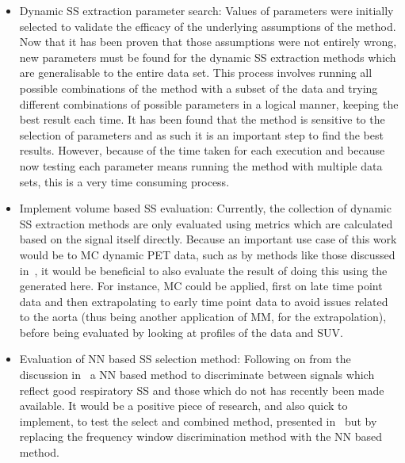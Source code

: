             \begin{itemize}
                \item Dynamic \gls{SS} extraction parameter search: Values of parameters were initially selected to validate the efficacy of the underlying assumptions of the method. Now that it has been proven that those assumptions were not entirely wrong, new parameters must be found for the dynamic \gls{SS} extraction methods which are generalisable to the entire data set. This process involves running all possible combinations of the method with a subset of the data and trying different combinations of possible parameters in a logical manner, keeping the best result each time. It has been found that the method is sensitive to the selection of parameters and as such it is an important step to find the best results. However, because of the time taken for each execution and because now testing each parameter means running the method with multiple data sets, this is a very time consuming process.
    
                \item Implement volume based \gls{SS} evaluation: Currently, the collection of dynamic \gls{SS} extraction methods are only evaluated using metrics which are calculated based on the signal itself directly. Because an important use case of this work would be to \gls{MC} dynamic \gls{PET} data, such as by methods like those discussed in~, it would be beneficial to also evaluate the result of doing this using the  generated here. For instance, \gls{MC} could be applied, first on late time point data and then extrapolating to early time point data to avoid issues related to the aorta (thus being another application of \gls{MM}, for the extrapolation), before being evaluated by looking at profiles of the data and \gls{SUV}.
    
                \item Evaluation of \gls{NN} based \gls{SS} selection method: Following on from the discussion in~ a \gls{NN} based method to discriminate between signals which reflect good respiratory \gls{SS} and those which do not has recently been made available. It would be a positive piece of research, and also quick to implement, to test the select and combined method, presented in~ but by replacing the frequency window discrimination method with the \gls{NN} based method.
            \end{itemize}
        
